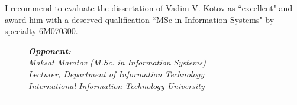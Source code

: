 \begin{titlepage}
    I recommend to evaluate the dissertation of Vadim V. Kotov as ``excellent" and award him with a deserved qualification ``MSc in Information Systems" by specialty 6M070300.

        \begin{figure}[ht]
            \begin{minipage}[t]{0.7\linewidth}{\em \small
                {\bf Opponent: }\\
                Maksat Maratov (M.Sc. in Information Systems)\\
                Lecturer, Department of Information Technology\\
                International Information Technology University
                \vspace{14pt}
                
                \rule{13em}{0.4pt}\\
                }
            \end{minipage}
        \end{figure}
        
    \end{titlepage}